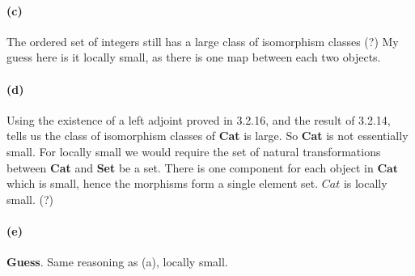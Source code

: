 \documentclass{article}
\begin{document}
\paragraph{(c)}
The ordered set of integers still has a large class of isomorphism classes (?) My guess here is it locally small, as there is one map between each two objects.
\paragraph{(d)} Using the existence of a left adjoint proved in 3.2.16, and the result of 3.2.14, tells us the class of isomorphism classes of \textbf{Cat} is large. So \textbf{Cat} is not essentially small. For locally small we would require the set of natural transformations between \textbf{Cat} and \textbf{Set} be a set. There is one component for each object in $\textbf{Cat}$ which is small, hence the morphisms form a single element set. $Cat$ is locally small. (?)
\paragraph{(e)} \textbf{Guess}. Same reasoning as (a), locally small.
\end{document}
